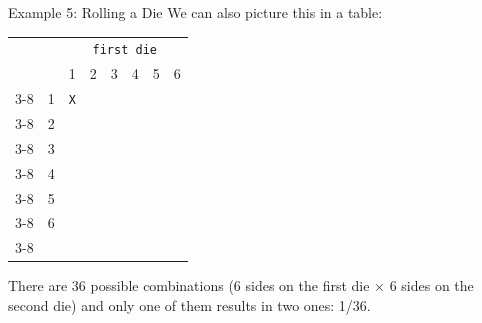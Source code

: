 \begin{frame}{Example 5: Rolling a Die}
    We can also picture this in a table:
    \begin{table}[]
    \begin{tabular}{rccccccc}
    \multicolumn{1}{c}{}                                  &                        & \multicolumn{6}{c}{\texttt{first die}}                                                                                       \\
    \multicolumn{1}{c}{}                                  &                        & 1                     & 2                     & 3                     & 4                     & 5                     & 6                     \\ \cline{3-8} 
    \multirow{6}{*}{\texttt{second die}} & \multicolumn{1}{c|}{1} & \multicolumn{1}{c|}{\texttt{X}} & \multicolumn{1}{c|}{} & \multicolumn{1}{c|}{} & \multicolumn{1}{c|}{} & \multicolumn{1}{c|}{} & \multicolumn{1}{c|}{} \\ \cline{3-8} 
                                                      & \multicolumn{1}{c|}{2} & \multicolumn{1}{c|}{} & \multicolumn{1}{c|}{} & \multicolumn{1}{c|}{} & \multicolumn{1}{c|}{} & \multicolumn{1}{c|}{} & \multicolumn{1}{c|}{} \\ \cline{3-8} 
                                                      & \multicolumn{1}{c|}{3} & \multicolumn{1}{c|}{} & \multicolumn{1}{c|}{} & \multicolumn{1}{c|}{} & \multicolumn{1}{c|}{} & \multicolumn{1}{c|}{} & \multicolumn{1}{c|}{} \\ \cline{3-8} 
                                                      & \multicolumn{1}{c|}{4} & \multicolumn{1}{c|}{} & \multicolumn{1}{c|}{} & \multicolumn{1}{c|}{} & \multicolumn{1}{c|}{} & \multicolumn{1}{c|}{} & \multicolumn{1}{c|}{} \\ \cline{3-8} 
                                                      & \multicolumn{1}{c|}{5} & \multicolumn{1}{c|}{} & \multicolumn{1}{c|}{} & \multicolumn{1}{c|}{} & \multicolumn{1}{c|}{} & \multicolumn{1}{c|}{} & \multicolumn{1}{c|}{} \\ \cline{3-8} 
                                                      & \multicolumn{1}{c|}{6} & \multicolumn{1}{c|}{} & \multicolumn{1}{c|}{} & \multicolumn{1}{c|}{} & \multicolumn{1}{c|}{} & \multicolumn{1}{c|}{} & \multicolumn{1}{c|}{} \\ \cline{3-8} 
    \end{tabular}
    \end{table}
    There are 36 possible combinations (6 sides on the first die $\times$ 6 sides on the second die) and only one of them results in two ones: 1/36. 
\end{frame}

